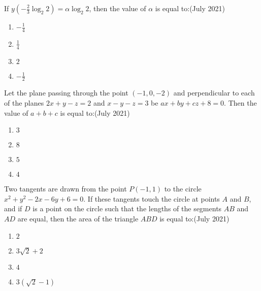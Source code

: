     If $ y\left(-\frac{2}{3} \log_2 2\right) = \alpha \log_2 2$, then the value of $ \alpha $ is equal to:\hfill{(July 2021)}
    \begin{enumerate}
        \item $ -\frac{1}{4} $
        \item $ \frac{1}{4} $
        \item $ 2 $
        \item $ -\frac{1}{2} $
    \end{enumerate}
    \item Let the plane passing through the point $(-1, 0, -2)$ and perpendicular to each of the planes $2x + y - z = 2$ and $x - y - z = 3$ be $ax + by + cz + 8 = 0$. Then the value of $ a + b + c $ is equal to:\hfill{(July 2021)}
    \begin{enumerate}
        \item $ 3 $
        \item $ 8 $
        \item $ 5 $
        \item $ 4 $
    \end{enumerate}

    \item Two tangents are drawn from the point $P(-1, 1)$ to the circle $x^2 + y^2 - 2x - 6y + 6 = 0$. If these tangents touch the circle at points $A$ and $B$, and if $D$ is a point on the circle such that the lengths of the segments $AB$ and $AD$ are equal, then the area of the triangle $ABD$ is equal to:\hfill{(July 2021)}
    \begin{enumerate}
        \item $ 2 $
        \item $ 3\sqrt{2} + 2 $
        \item $ 4 $
	\item $ 3(\sqrt{2} - 1) $
    \end{enumerate}

  
%

